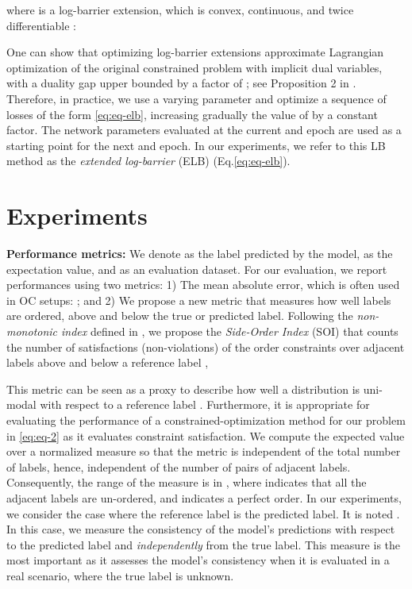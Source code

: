 \documentclass[8pt]{article}
\theoremstyle{definition}
\begin{document}
where  is a log-barrier extension, which is convex, continuous, and twice differentiable \citep{kervadec2019log}:

One can show that optimizing log-barrier extensions approximate Lagrangian optimization of the original constrained problem with implicit dual variables, with a duality gap upper bounded by a factor of ; see Proposition 2 in \citep{kervadec2019log}.
Therefore, in practice, we use a varying parameter  and optimize a sequence of losses of the form \eqref{eq:eq-elb}, increasing gradually the value of  by a constant factor. The network parameters evaluated at the current  and epoch are used as a starting point for the next  and epoch.
In our experiments, we refer to this LB method as the \emph{extended log-barrier} (ELB) (Eq.\ref{eq:eq-elb}).




\section{Experiments}
\label{sec:experiments}

\noindent \textbf{Performance metrics:}
We denote  as the label predicted by the model,  as the expectation value, and  as an evaluation dataset. For our evaluation, we report performances using two metrics:
1) The mean absolute error, which is often used in OC setups: ; and
2) We propose a new metric that measures how well labels are ordered, above and below the true or predicted label.
Following the \emph{non-monotonic index} defined in \citep{ben1995monotonicity,gutierrez2016current}, we propose the \emph{Side-Order Index} (SOI) that counts the number of satisfactions (non-violations) of the order constraints over adjacent labels above and below a reference label ,

This metric can be seen as a proxy to describe how well a distribution is uni-modal with respect to a reference label .
    Furthermore, it is appropriate for evaluating the performance of a constrained-optimization method for our problem
    in \eqref{eq:eq-2} as it evaluates constraint satisfaction. We compute the expected value over a normalized measure so that the metric is independent of the total number of labels, hence, independent of the number of pairs of  adjacent labels. Consequently, the range of the measure is in , where  indicates that all the adjacent labels are un-ordered, and  indicates a perfect order.   In our experiments, we consider the case where the reference label  is the predicted label. It is noted . In this case, we measure the consistency of the model's predictions with respect to the predicted label and \emph{independently} from the true label. This measure is the most important as it assesses the model's consistency when it is evaluated in a real scenario, where the true label is unknown.
\end{document}
